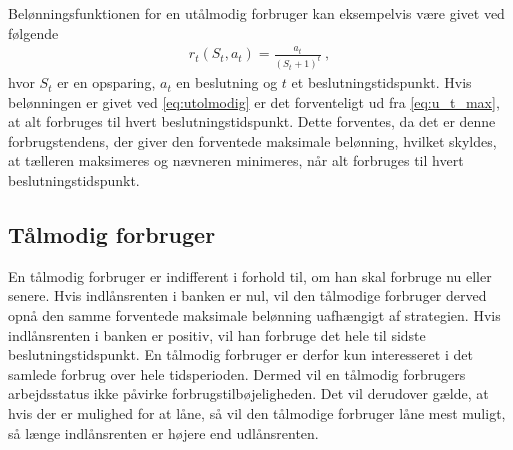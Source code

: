 

Belønningsfunktionen for en utålmodig forbruger kan eksempelvis være givet ved følgende
\begin{align}\label{eq:utolmodig}
    r_t(S_t, a_t) = \frac{a_t}{(S_t+1)^t} \ ,
\end{align}
hvor $S_t$ er en opsparing, $a_t$ en beslutning og $t$ et beslutningstidspunkt. Hvis belønningen er givet ved \eqref{eq:utolmodig} er det forventeligt ud fra \eqref{eq:u_t_max}, at alt forbruges til hvert beslutningstidspunkt. Dette forventes, da det er denne forbrugstendens, der giver den forventede maksimale belønning, hvilket skyldes, at tælleren maksimeres og nævneren minimeres, når alt forbruges til hvert beslutningstidspunkt.





\subsection{Tålmodig forbruger}
En tålmodig forbruger er indifferent i forhold til, om han skal forbruge nu eller senere. Hvis indlånsrenten i banken er nul, vil den tålmodige forbruger derved opnå den samme forventede maksimale belønning uafhængigt af strategien. Hvis indlånsrenten i banken er positiv, vil han forbruge det hele til sidste beslutningstidspunkt. En tålmodig forbruger er derfor kun interesseret i det samlede forbrug over hele tidsperioden. Dermed vil en tålmodig forbrugers arbejdsstatus ikke påvirke forbrugstilbøjeligheden. Det vil derudover gælde, at hvis der er mulighed for at låne, så vil den tålmodige forbruger låne mest muligt, så længe indlånsrenten er højere end udlånsrenten. 


